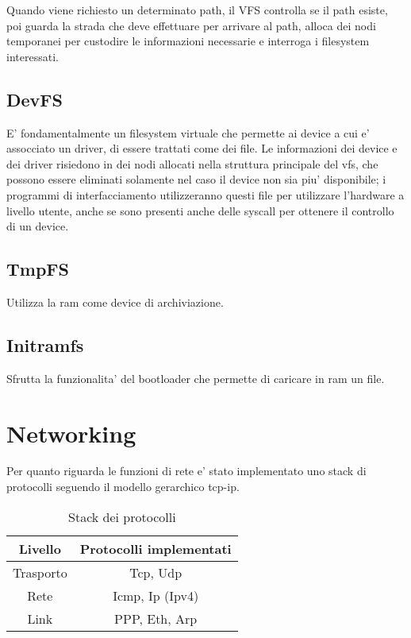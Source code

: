 \documentclass[a4paper,10pt]{book}
\begin{document}
Quando viene richiesto un determinato path, il VFS controlla se il path esiste, poi guarda 
la strada che deve effettuare per arrivare al path, alloca dei nodi temporanei per custodire le informazioni
necessarie e interroga i filesystem interessati.

\subsection{DevFS}
E' fondamentalmente un filesystem virtuale che permette ai device a cui e' assocciato un driver, di essere
trattati come dei file. Le informazioni dei device e dei driver risiedono in dei nodi allocati
nella struttura principale del vfs, che possono essere eliminati solamente nel caso il device non sia 
piu' disponibile; i programmi di interfacciamento utilizzeranno questi file per utilizzare 
l'hardware a livello utente, anche se sono presenti anche delle syscall per ottenere il controllo di
un device. 

\subsection{TmpFS}
Utilizza la ram come device di archiviazione.

\subsection{Initramfs}
Sfrutta la funzionalita' del bootloader che permette di caricare in ram un file.







\section{Networking}
Per quanto riguarda le funzioni di rete e' stato implementato uno stack di protocolli
seguendo il modello gerarchico tcp-ip.

\begin{table}[h]
	\begin{center}
	    \begin{tabular}{ | c | c |}
	    \hline
	     Livello & Protocolli implementati     \\ \hline
		 Trasporto & Tcp, Udp\\ \hline
		 Rete & Icmp, Ip (Ipv4)\\ \hline
		 Link & PPP, Eth, Arp\\ \hline
	    \end{tabular}
	\end{center}
	\caption{Stack dei protocolli}
	\label{tab:net_stack}
\end{table}
\end{document}
